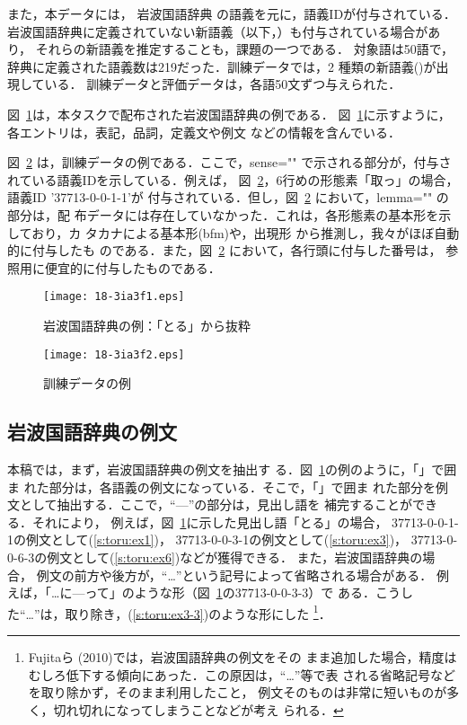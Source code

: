 \documentclass[japanese]{jnlp_1.4}
\newcommand{\X}{}
\begin{document}
また，本データには，
岩波国語辞典\cite{Nishio:Iwabuchi:Mizutani:1994j}
の語義を元に，語義IDが付与されている．
岩波国語辞典に定義されていない新語義（以下，\X{}）も付与されている場合があり，
それらの新語義を推定することも，課題の一つである．
対象語は50語で，辞典に定義された語義数は219だった．訓練データでは，2
種類の新語義(\X)が出現している．
訓練データと評価データは，各語50文ずつ与えられた．

図~\ref{fig:iwanami}は，本タスクで配布された岩波国語辞典の例である．
図~\ref{fig:iwanami}に示すように，各エントリは，表記，品詞，定義文や例文
などの情報を含んでいる．

図~\ref{fig:trnORG} は，訓練データの例である．ここで，sense=""
で示される部分が，付与されている語義IDを示している．例えば，
図~\ref{fig:trnORG}，6行めの形態素「取っ」の場合，語義ID '37713-0-0-1-1'が
付与されている．但し，図~\ref{fig:trnORG} において，lemma="" の部分は，配
布データには存在していなかった．これは，各形態素の基本形を示しており，カ
タカナによる基本形(bfm)や，出現形
から推測し，我々がほぼ自動的に付与したも
のである．また，図~\ref{fig:trnORG} において，各行頭に付与した番号は，
参照用に便宜的に付与したものである．

\begin{figure}[t]
\texttt{[image: 18-3ia3f1.eps]}
\caption{岩波国語辞典の例：「とる」から抜粋}
\label{fig:iwanami}
\end{figure}
\begin{figure}[t]
\texttt{[image: 18-3ia3f2.eps]}
\caption{訓練データの例} \label{fig:trnORG}
\end{figure}


\subsection{岩波国語辞典の例文} 
\label{sec:iwanami-ex}

本稿では，まず，岩波国語辞典の例文を抽出す
る．図~\ref{fig:iwanami}の例のように，「」で囲ま
れた部分は，各語義の例文になっている．そこで，「」で囲ま
れた部分を例文として抽出する．ここで，``—''の部分は，見出し語を
補完することができる．それにより，
例えば，図~\ref{fig:iwanami}に示した見出し語「とる」の場合，
37713-0-0-1-1の例文として(\ref{s:toru:ex1})，
37713-0-0-3-1の例文として(\ref{s:toru:ex3})，
37713-0-0-6-3の例文として(\ref{s:toru:ex6})などが獲得できる．
また，岩波国語辞典の場合，
例文の前方や後方が，``…''という記号によって省略される場合がある．
例えば，「…に—って」のような形（図~\ref{fig:iwanami}の37713-0-0-3-3）で
ある．こうした``…''は，取り除き，(\ref{s:toru:ex3-3})のような形にした
\footnote{Fujitaら (2010)では，岩波国語辞典の例文をその
まま追加した場合，精度はむしろ低下する傾向にあった．この原因は，``…''等で表
される省略記号などを取り除かず，そのまま利用したこと，
例文そのものは非常に短いものが多く，切れ切れになってしまうことなどが考え
られる．
}．
\end{document}
